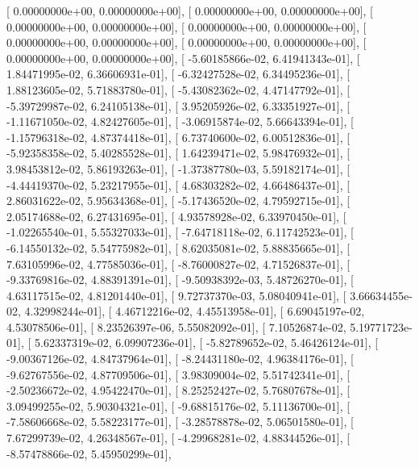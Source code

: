 \documentclass{article}
\begin{document}
       [  0.00000000e+00,   0.00000000e+00],
       [  0.00000000e+00,   0.00000000e+00],
       [  0.00000000e+00,   0.00000000e+00],
       [  0.00000000e+00,   0.00000000e+00],
       [  0.00000000e+00,   0.00000000e+00],
       [  0.00000000e+00,   0.00000000e+00],
       [  0.00000000e+00,   0.00000000e+00],
       [ -5.60185866e-02,   6.41941343e-01],
       [  1.84471995e-02,   6.36606931e-01],
       [ -6.32427528e-02,   6.34495236e-01],
       [  1.88123605e-02,   5.71883780e-01],
       [ -5.43082362e-02,   4.47147792e-01],
       [ -5.39729987e-02,   6.24105138e-01],
       [  3.95205926e-02,   6.33351927e-01],
       [ -1.11671050e-02,   4.82427605e-01],
       [ -3.06915874e-02,   5.66643394e-01],
       [ -1.15796318e-02,   4.87374418e-01],
       [  6.73740600e-02,   6.00512836e-01],
       [ -5.92358358e-02,   5.40285528e-01],
       [  1.64239471e-02,   5.98476932e-01],
       [  3.98453812e-02,   5.86193263e-01],
       [ -1.37387780e-03,   5.59182174e-01],
       [ -4.44419370e-02,   5.23217955e-01],
       [  4.68303282e-02,   4.66486437e-01],
       [  2.86031622e-02,   5.95634368e-01],
       [ -5.17436520e-02,   4.79592715e-01],
       [  2.05174688e-02,   6.27431695e-01],
       [  4.93578928e-02,   6.33970450e-01],
       [ -1.02265540e-01,   5.55327033e-01],
       [ -7.64718118e-02,   6.11742523e-01],
       [ -6.14550132e-02,   5.54775982e-01],
       [  8.62035081e-02,   5.88835665e-01],
       [  7.63105996e-02,   4.77585036e-01],
       [ -8.76000827e-02,   4.71526837e-01],
       [ -9.33769816e-02,   4.88391391e-01],
       [ -9.50938392e-03,   5.48726270e-01],
       [  4.63117515e-02,   4.81201440e-01],
       [  9.72737370e-03,   5.08040941e-01],
       [  3.66634455e-02,   4.32998244e-01],
       [  4.46712216e-02,   4.45513958e-01],
       [  6.69045197e-02,   4.53078506e-01],
       [  8.23526397e-06,   5.55082092e-01],
       [  7.10526874e-02,   5.19771723e-01],
       [  5.62337319e-02,   6.09907236e-01],
       [ -5.82789652e-02,   5.46426124e-01],
       [ -9.00367126e-02,   4.84737964e-01],
       [ -8.24431180e-02,   4.96384176e-01],
       [ -9.62767556e-02,   4.87709506e-01],
       [  3.98309004e-02,   5.51742341e-01],
       [ -2.50236672e-02,   4.95422470e-01],
       [  8.25252427e-02,   5.76807678e-01],
       [  3.09499255e-02,   5.90304321e-01],
       [ -9.68815176e-02,   5.11136700e-01],
       [ -7.58606668e-02,   5.58223177e-01],
       [ -3.28578878e-02,   5.06501580e-01],
       [  7.67299739e-02,   4.26348567e-01],
       [ -4.29968281e-02,   4.88344526e-01],
       [ -8.57478866e-02,   5.45950299e-01],
\end{document}
